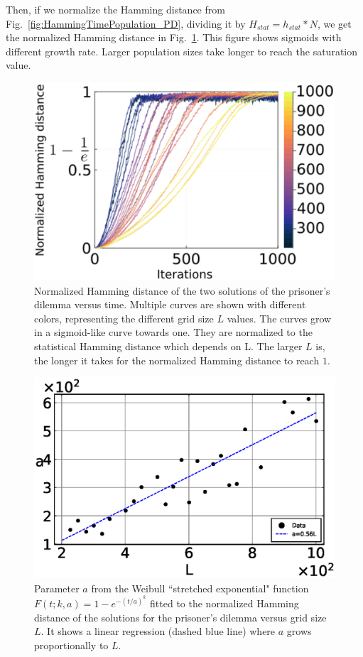 Then, if we normalize the Hamming distance from Fig.~\ref{fig:HammingTimePopulation_PD}, dividing it by $H_{stat} = h_{stat}*N$, we get the normalized Hamming distance in Fig.~\ref{fig:NormalHammingTimePopulation_PD}. This figure shows sigmoids with different growth rate. Larger population sizes take longer to reach the saturation value.



\begin{figure}
	\centering
	\includegraphics[width=0.8\linewidth]{Images/P3/NormalHammingTimePopulation_PD.eps}
	\caption{ Normalized Hamming distance of the two solutions of the prisoner's dilemma versus time. Multiple curves are shown with different colors, representing the different grid size $L$ values. The curves grow in a sigmoid-like curve towards one. They are normalized to the statistical Hamming distance which depends on L. The larger $L$ is, the longer it takes for the normalized Hamming distance to reach $1$.}
	\label{fig:NormalHammingTimePopulation_PD}
\end{figure}


\begin{figure}
	\centering
	\includegraphics[width=0.8\linewidth]{Images/P3/aVSL_PD.eps}
	\caption{Parameter $a$ from the Weibull ``stretched exponential" function $F(t;k,a)=1-e^{-(t/a)^k}$ fitted to the normalized Hamming distance of the solutions for the prisoner's dilemma versus grid size $L$. It shows a linear regression (dashed blue line) where $a$ grows proportionally to $L$.}
	\label{fig:aVSL_PD}
\end{figure}





